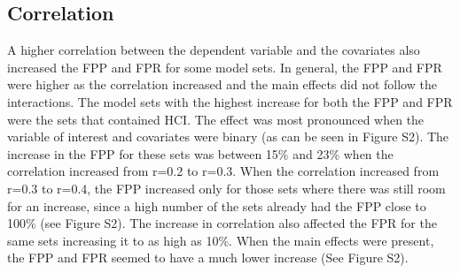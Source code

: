 \subsection{Correlation}
A higher correlation between the dependent variable and the covariates also increased the FPP and FPR for some model sets. In general, the FPP and FPR were higher as the correlation increased and the main effects did not follow the interactions. The model sets with the highest increase for both the FPP and FPR were the sets that contained HCI. The effect was most pronounced when the variable of interest and covariates were binary (as can be seen in Figure S2). The increase in the FPP for these sets was between 15\% and 23\% when the correlation increased from r=0.2 to r=0.3. When the correlation increased from r=0.3 to r=0.4, the FPP increased only for those sets where there was still room for an increase, since a high number of the sets already had the FPP close to 100\% (see Figure S2). The increase in correlation also affected the FPR for the same sets increasing it to as high as 10\%. When the main effects were present, the FPP and FPR seemed to have a much lower increase (See Figure S2).